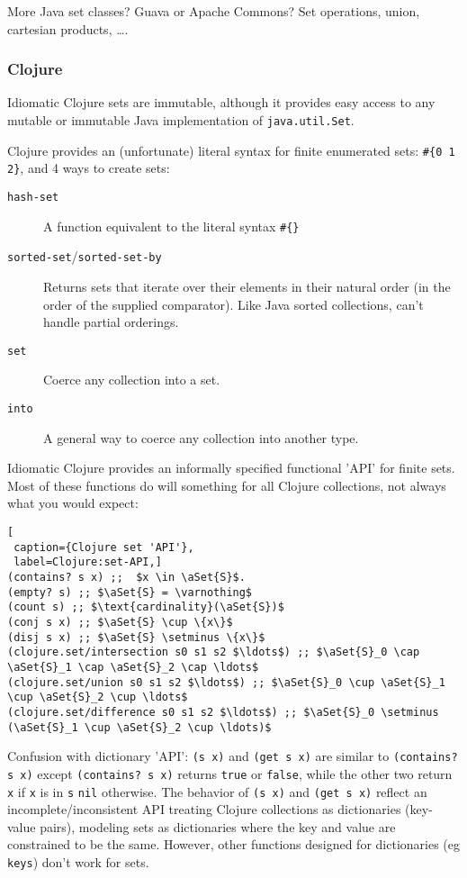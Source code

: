 More Java set classes? Guava or Apache Commons?
Set operations, union, cartesian products, \ldots.

\subsubsection{Clojure}
\lstset{language=Clojure}

Idiomatic Clojure sets are immutable, although it provides easy
access to any mutable or immutable Java implementation of
\lstinline|java.util.Set|.

Clojure provides an (unfortunate) literal syntax for finite
enumerated sets: 
\lstinline|#{0 1 2}|, and 4 ways to create sets:
\begin{description}
\item[\texttt{hash-set}] A function equivalent to the
literal syntax \lstinline|#{}|
\item[\texttt{sorted-set}/\texttt{sorted-set-by}] Returns
sets that iterate over their elements in their natural order (in the
order of the supplied comparator). Like Java sorted collections,
can't handle partial orderings.
\item[\texttt{set}] Coerce any collection into a set.
\item[\texttt{into}] A general way to coerce any collection
into another type.
\end{description}

Idiomatic Clojure provides an informally specified functional
'API' for finite sets. Most of these functions do will something
for all Clojure collections, not always what you would expect:
\begin{lstlisting}[
 caption={Clojure set 'API'}, 
 label=Clojure:set-API,]
(contains? s x) ;;  $x \in \aSet{S}$.
(empty? s) ;; $\aSet{S} = \varnothing$
(count s) ;; $\text{cardinality}(\aSet{S})$
(conj s x) ;; $\aSet{S} \cup \{x\}$
(disj s x) ;; $\aSet{S} \setminus \{x\}$
(clojure.set/intersection s0 s1 s2 $\ldots$) ;; $\aSet{S}_0 \cap \aSet{S}_1 \cap \aSet{S}_2 \cap \ldots$ 
(clojure.set/union s0 s1 s2 $\ldots$) ;; $\aSet{S}_0 \cup \aSet{S}_1 \cup \aSet{S}_2 \cup \ldots$ 
(clojure.set/difference s0 s1 s2 $\ldots$) ;; $\aSet{S}_0 \setminus (\aSet{S}_1 \cup \aSet{S}_2 \cup \ldots)$
\end{lstlisting}

Confusion with dictionary 'API':
 \lstinline|(s x)| and \lstinline|(get s x)| are similar to
 \lstinline|(contains? s x)| except \lstinline|(contains? s x)| returns
 \lstinline|true| or \lstinline|false|, while the other two return
 \lstinline|x| if \lstinline|x| is in \lstinline|s| \lstinline|nil| otherwise.
The behavior of \lstinline|(s x)| and \lstinline|(get s x)| reflect an
incomplete/inconsistent API treating Clojure collections as
dictionaries (key-value pairs), modeling sets as dictionaries
where the key and value are constrained to be the same.
However, other functions designed for dictionaries (eg
\lstinline|keys|) don't work for sets.
 
